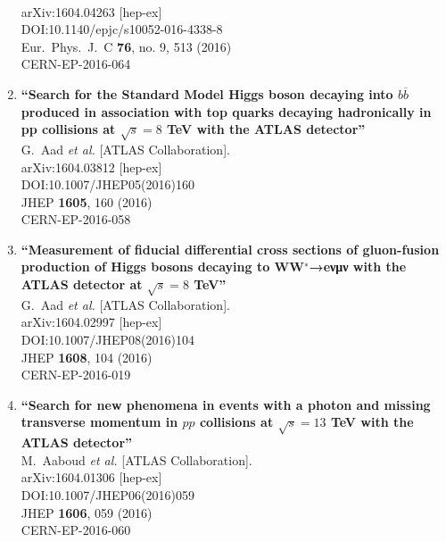 \documentclass{article}
\begin{document}
\begin{enumerate}
  \\{}arXiv:1604.04263 [hep-ex]
  \\{}DOI:10.1140/epjc/s10052-016-4338-8
  \\{}Eur.\ Phys.\ J.\ C {\bf 76}, no. 9, 513 (2016)
  \\{}CERN-EP-2016-064
\item%
{\bf ``Search for the Standard Model Higgs boson decaying into $ b\overline{b} $ produced in association with top quarks decaying hadronically in pp collisions at $ \sqrt{s}=8 $ TeV with the ATLAS detector''}
  \\{}G.~Aad {\it et al.} [ATLAS Collaboration].
  \\{}arXiv:1604.03812 [hep-ex]
  \\{}DOI:10.1007/JHEP05(2016)160
  \\{}JHEP {\bf 1605}, 160 (2016)
  \\{}CERN-EP-2016-058
\item%
{\bf ``Measurement of fiducial differential cross sections of gluon-fusion production of Higgs bosons decaying to WW$^{∗}$→eνμν with the ATLAS detector at $ \sqrt{s}=8 $ TeV''}
  \\{}G.~Aad {\it et al.} [ATLAS Collaboration].
  \\{}arXiv:1604.02997 [hep-ex]
  \\{}DOI:10.1007/JHEP08(2016)104
  \\{}JHEP {\bf 1608}, 104 (2016)
  \\{}CERN-EP-2016-019
\item%
{\bf ``Search for new phenomena in events with a photon and missing transverse momentum in $pp$ collisions at $\sqrt{s}=13$ TeV with the ATLAS detector''}
  \\{}M.~Aaboud {\it et al.} [ATLAS Collaboration].
  \\{}arXiv:1604.01306 [hep-ex]
  \\{}DOI:10.1007/JHEP06(2016)059
  \\{}JHEP {\bf 1606}, 059 (2016)
  \\{}CERN-EP-2016-060

\end{enumerate}
\end{document}
